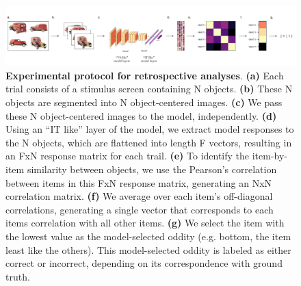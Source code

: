 \documentclass[11pt]{article}
\newcommand{\beginsupplement}{
    \setcounter{figure}{0}
    \renewcommand{\thefigure}{S\arabic{figure}}}
\begin{document}
\beginsupplement

\begin{figure}[ht]
\centering
\includegraphics[width=\linewidth]{figures/S1}
\renewcommand{\figurename}{Supplementary Figure}
\caption{\textbf{ Experimental protocol for retrospective analyses}. \textbf{(a)} Each trial consists of a stimulus screen containing N objects. \textbf{(b)} These N objects are segmented into N object-centered images. \textbf{(c)} We pass these N object-centered images to the model, independently. \textbf{(d)} Using an “IT like” layer of the model, we extract model responses to the N objects, which are flattened into length F vectors, resulting in an FxN response matrix for each trail. \textbf{(e)} To identify the item-by-item similarity between objects, we use the Pearson’s correlation between items in this FxN response matrix, generating an NxN correlation matrix. \textbf{(f)} We average over each item's off-diagonal correlations, generating a single vector that corresponds to each items correlation with all other items. \textbf{(g)} We select the item with the lowest value as the model-selected oddity (e.g. bottom, the item least like the others). This model-selected oddity is labeled as either correct or incorrect, depending on its correspondence with ground truth.}
\label{fig:retrospective_protocol}
\end{figure}
\end{document}
